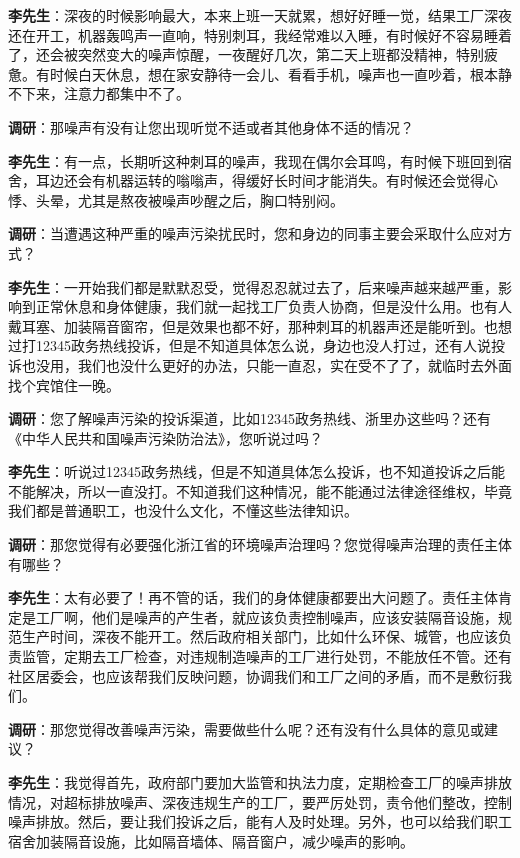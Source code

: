 \begin{appendices}
\textbf{李先生}：深夜的时候影响最大，本来上班一天就累，想好好睡一觉，结果工厂深夜还在开工，机器轰鸣声一直响，特别刺耳，我经常难以入睡，有时候好不容易睡着了，还会被突然变大的噪声惊醒，一夜醒好几次，第二天上班都没精神，特别疲惫。有时候白天休息，想在家安静待一会儿、看看手机，噪声也一直吵着，根本静不下来，注意力都集中不了。

\textbf{调研}：那噪声有没有让您出现听觉不适或者其他身体不适的情况？

\textbf{李先生}：有一点，长期听这种刺耳的噪声，我现在偶尔会耳鸣，有时候下班回到宿舍，耳边还会有机器运转的嗡嗡声，得缓好长时间才能消失。有时候还会觉得心悸、头晕，尤其是熬夜被噪声吵醒之后，胸口特别闷。

\textbf{调研}：当遭遇这种严重的噪声污染扰民时，您和身边的同事主要会采取什么应对方式？

\textbf{李先生}：一开始我们都是默默忍受，觉得忍忍就过去了，后来噪声越来越严重，影响到正常休息和身体健康，我们就一起找工厂负责人协商，但是没什么用。也有人戴耳塞、加装隔音窗帘，但是效果也都不好，那种刺耳的机器声还是能听到。也想过打12345政务热线投诉，但是不知道具体怎么说，身边也没人打过，还有人说投诉也没用，我们也没什么更好的办法，只能一直忍，实在受不了了，就临时去外面找个宾馆住一晚。

\textbf{调研}：您了解噪声污染的投诉渠道，比如12345政务热线、浙里办这些吗？还有《中华人民共和国噪声污染防治法》，您听说过吗？

\textbf{李先生}：听说过12345政务热线，但是不知道具体怎么投诉，也不知道投诉之后能不能解决，所以一直没打。不知道我们这种情况，能不能通过法律途径维权，毕竟我们都是普通职工，也没什么文化，不懂这些法律知识。

\textbf{调研}：那您觉得有必要强化浙江省的环境噪声治理吗？您觉得噪声治理的责任主体有哪些？

\textbf{李先生}：太有必要了！再不管的话，我们的身体健康都要出大问题了。责任主体肯定是工厂啊，他们是噪声的产生者，就应该负责控制噪声，应该安装隔音设施，规范生产时间，深夜不能开工。然后政府相关部门，比如什么环保、城管，也应该负责监管，定期去工厂检查，对违规制造噪声的工厂进行处罚，不能放任不管。还有社区居委会，也应该帮我们反映问题，协调我们和工厂之间的矛盾，而不是敷衍我们。

\textbf{调研}：那您觉得改善噪声污染，需要做些什么呢？还有没有什么具体的意见或建议？

\textbf{李先生}：我觉得首先，政府部门要加大监管和执法力度，定期检查工厂的噪声排放情况，对超标排放噪声、深夜违规生产的工厂，要严厉处罚，责令他们整改，控制噪声排放。然后，要让我们投诉之后，能有人及时处理。另外，也可以给我们职工宿舍加装隔音设施，比如隔音墙体、隔音窗户，减少噪声的影响。


\end{appendices}
